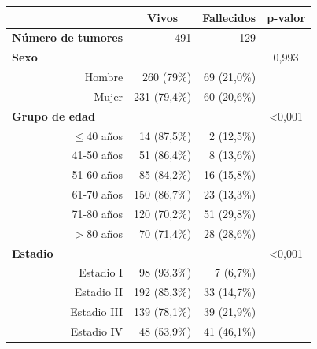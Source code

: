 \begin{table}[H]
		\centering
	\begin{tabular}{rrrc}
		\cline{2-4}
		\multicolumn{1}{l}{}                           & \multicolumn{1}{c}{\textbf{Vivos}} & \multicolumn{1}{c}{\textbf{Fallecidos}} & \multicolumn{1}{c}{\textbf{p-valor}} \\ \hline
		\multicolumn{1}{l}{\textbf{Número de tumores}} & 491            & 129                 &                  \\ \hline
		\multicolumn{1}{l}{\textbf{Sexo}}              &                &                     & 0,993            \\
		Hombre                                         & 260 (79\%)     & 69 (21,0\%)           &                  \\
		Mujer                                          & 231 (79,4\%)   & 60 (20,6\%)         &                  \\ \hline
		\multicolumn{1}{l}{\textbf{Grupo de edad}}     &                &                     & \textless{}0,001 \\
		$\leq$40 años                                     & 14 (87,5\%)    & 2 (12,5\%)          &                  \\
		41-50 años                                     & 51 (86,4\%)    & 8 (13,6\%)          &                  \\
		51-60 años                                     & 85 (84,2\%)    & 16 (15,8\%)         &                  \\
		61-70 años                                     & 150 (86,7\%)   & 23 (13,3\%)         &                  \\
		71-80 años                                     & 120 (70,2\%)   & 51 (29,8\%)         &                  \\
		$>$80 años                                  & 70 (71,4\%)    & 28 (28,6\%)         &                  \\ \hline
		\multicolumn{1}{l}{\textbf{Estadio}}           &                &                     & \textless{}0,001 \\
		Estadio I                                      & 98 (93,3\%)    & 7 (6,7\%)           &                  \\
		Estadio II                                     & 192 (85,3\%)   & 33 (14,7\%)         &                  \\
		Estadio III                                    & 139 (78,1\%)   & 39 (21,9\%)         &                  \\
		Estadio IV                                     & 48 (53,9\%)    & 41 (46,1\%)         &                  \\ \hline
	\end{tabular}
\end{table}

